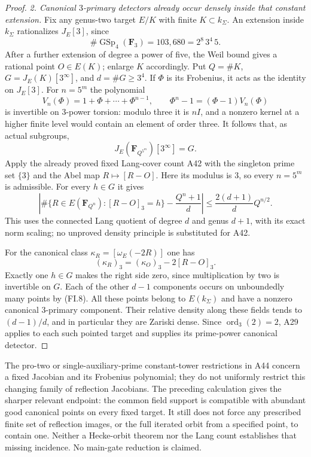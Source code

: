 \begin{proof}
\emph{2. Canonical $3$-primary detectors already occur densely inside
that constant extension.}
Fix any genus-two target $E/K$ with finite $K\subset k_\Sigma$.
An extension inside $k_\Sigma$ rationalizes $J_E[3]$, since
\[
 \#\operatorname{GSp}_4(\mathbf F_3)
       =103{,}680=2^8\,3^4\,5.
 \tag{FI.5}
\]
After a further extension of degree a power of five, the Weil
bound gives a rational point $O\in E(K)$; enlarge $K$ accordingly.
Put $Q=\#K$, $G=J_E(K)[3^\infty]$, and $d=\#G\ge3^4$.
If $\Phi$ is its Frobenius, it acts as the identity on $J_E[3]$.
For $n=5^m$ the polynomial
\[
  V_n(\Phi)=1+\Phi+\cdots+\Phi^{n-1},\qquad
  \Phi^n-1=(\Phi-1)V_n(\Phi)
 \tag{FI.6}
\]
is invertible on $3$-power torsion: modulo three it is $nI$,
and a nonzero kernel at a higher finite level would contain an
element of order three. It follows that, as actual subgroups,
\[
                  J_E(\mathbf F_{Q^{5^m}})[3^\infty]=G.
 \tag{FI.7}
\]
Apply the already proved fixed Lang-cover count A42 with the
singleton prime set $\{3\}$ and the Abel map $R\mapsto[R-O]$.
Here its modulus is $3$, so every $n=5^m$ is admissible. For
every $h\in G$ it gives
\[
 \left|\#\{R\in E(\mathbf F_{Q^n}):[R-O]_3=h\}
                 -\frac{Q^n+1}{d}\right|
       \le\frac{2(d+1)}d Q^{n/2}.
 \tag{FI.8}
\]
This uses the connected Lang quotient of degree $d$ and genus
$d+1$, with its exact norm scaling; no unproved density
principle is substituted for A42.

For the canonical class $\kappa_R=[\omega_E(-2R)]$ one has
\[
             (\kappa_R)_3=(\kappa_O)_3-2[R-O]_3.
 \tag{FI.9}
\]
Exactly one $h\in G$ makes the right side zero, since
multiplication by two is invertible on $G$. Each of the other
$d-1$ components occurs on unboundedly many points by (FI.8).
All these points belong to $E(k_\Sigma)$ and have a nonzero
canonical $3$-primary component. Their relative density along
these fields tends to $(d-1)/d$, and in particular they are
Zariski dense. Since $\operatorname{ord}_3(2)=2$, A29 applies
to each such pointed target and supplies its prime-power
canonical detector.
\end{proof}

The pro-two or single-auxiliary-prime constant-tower restrictions
in A44 concern a fixed Jacobian and its Frobenius polynomial;
they do not uniformly restrict this changing family of reflection
Jacobians. The preceding calculation gives the sharper relevant
endpoint: the common field support is compatible with abundant
good canonical points on every fixed target. It still does not
force any prescribed finite set of reflection images, or the
full iterated orbit from a specified point, to contain one.
Neither a Hecke-orbit theorem nor the Lang count establishes
that missing incidence. No main-gate reduction is claimed.
